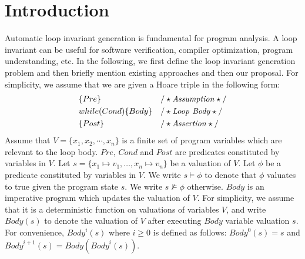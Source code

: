 
\section{Introduction} %
\label{sec:introduction}
Automatic loop invariant generation is fundamental for program analysis. A loop invariant can be useful for software verification, compiler optimization, program understanding, etc. In the following, we first define the loop invariant generation problem and then briefly mention existing approaches and then our proposal. For simplicity, we assume that we are given a Hoare triple in the following form:
\begin{align*}
&\{Pre\} & & /\star\text{\emph{Assumption}}\star/ \\
&while (Cond) \{ Body \} && /\star\text{\emph{Loop Body}}\star/\\
&\{Post\} & & /\star\text{\emph{Assertion}}\star/
\end{align*}
Assume that $V = \{x_1{,} x_2{,} \cdots{,} x_n\}$ is a finite set of program variables which are relevant to the loop body. $Pre$, $Cond$ and $Post$ are predicates constituted by variables in $V$.
Let $s = \{ x_1 \mapsto v_1, \ldots, x_n \mapsto v_n \}$ be a valuation of $V$. Let $\phi$ be a predicate constituted by variables in $V$. We write $s \models \phi$ to denote that $\phi$ valuates to true given the program state $s$. We write $s \not \models \phi$ otherwise.
$\mathit{Body}$ is an imperative program which updates the valuation of $V$. For simplicity, we assume that it is a deterministic function on valuations of variables $V$, and write $\mathit{Body}(s)$ to denote the valuation of $V$ after executing $\mathit{Body}$  variable valuation $s$. For convenience, $\mathit{Body}^i(s)$ where $i \geq 0$ is defined as follows: $\mathit{Body}^0(s) = s$ and $\mathit{Body}^{i+1}(s) = \mathit{Body}(\mathit{Body}^i(s))$.

